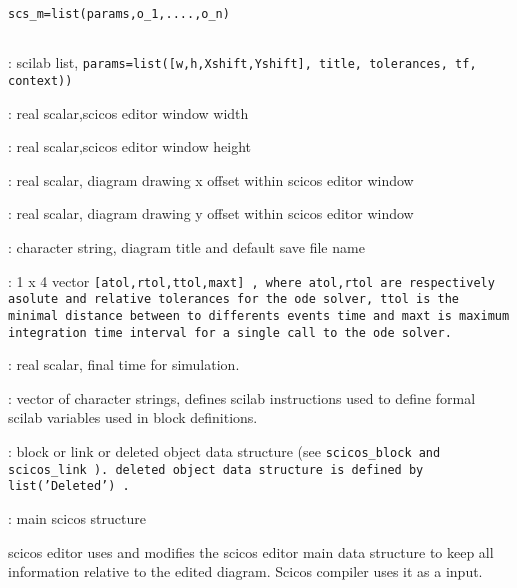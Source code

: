 
%
%


\label{scicosmain}

\begin{verbatim}
scs_m=list(params,o_1,....,o_n)


\end{verbatim}
\begin{scitem}
\item[{\verb?params?}]
: scilab list, %
\tt params=list([w,h,Xshift,Yshift], title, tolerances,
tf, context)) %
\rm \begin{scitem}
\item[{\verb?w ?}]
: real scalar,scicos editor window width
\item[{\verb?h ?}]
: real scalar,scicos editor window height
\item[{\verb?Xshift ?}]
: real scalar, diagram drawing x offset within scicos editor window
\item[{\verb?Yshift ?}]
: real scalar, diagram drawing y offset within scicos editor window
\item[{\verb?title ?}]
: character string, diagram title and default save file name
\item[{\verb?tolerances ?}]
: 1 x 4 vector %
\tt [atol,rtol,ttol,maxt]%
\rm , where  %
\tt atol,rtol %
\rm are
respectively asolute and relative tolerances for the ode solver,
%
\tt ttol %
\rm is the  minimal distance between to differents events time
and %
\tt maxt %
\rm is maximum integration time interval for a single call to the
ode solver.
\item[{\verb?tf?}]
: real scalar, final time for simulation.
\item[{\verb?context?}]
: vector of character strings, defines scilab instructions used to define
formal scilab variables  used in block definitions.
\end{scitem}
\item[{\verb?o\_i?}]
: block or link  or deleted object data structure (see
%
\tt scicos\_block %
\rm and %
\tt scicos\_link%
\rm ). deleted object data
structure is defined by %
\tt list('Deleted')%
\rm .
\item[{\verb?scs\_m?}]
: main scicos structure
\end{scitem}%
scicos editor uses and modifies the  scicos editor main  data
structure to keep all information relative to the edited
diagram. Scicos compiler uses it as a input.

